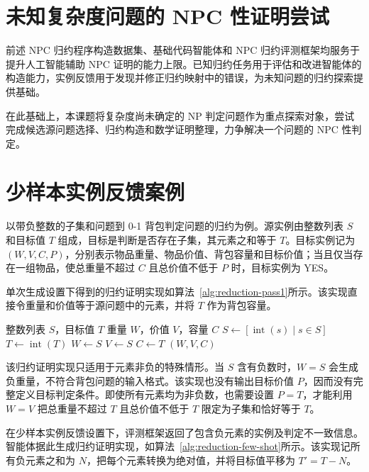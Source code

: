 \section{未知复杂度问题的 NPC 性证明尝试}

前述 NPC 归约程序构造数据集、基础代码智能体和 NPC 归约评测框架均服务于提升人工智能辅助 NPC 证明的能力上限。已知归约任务用于评估和改进智能体的构造能力，实例反馈用于发现并修正归约映射中的错误，为未知问题的归约探索提供基础。

在此基础上，本课题将复杂度尚未确定的 NP 判定问题作为重点探索对象，尝试完成候选源问题选择、归约构造和数学证明整理，力争解决一个问题的 NPC 性判定。

\section{少样本实例反馈案例}

以带负整数的子集和问题到 0-1 背包判定问题的归约为例。源实例由整数列表 \(S\) 和目标值 \(T\) 组成，目标是判断是否存在子集，其元素之和等于 \(T\)。目标实例记为 \((W,V,C,P)\)，分别表示物品重量、物品价值、背包容量和目标价值；当且仅当存在一组物品，使总重量不超过 \(C\) 且总价值不低于 \(P\) 时，目标实例为 YES。

单次生成设置下得到的归约证明实现如算法~\ref{alg:reduction-pass1}所示。该实现直接令重量和价值等于源问题中的元素，并将 \(T\) 作为背包容量。

\begin{algorithm}[!htbp]
    \small
    \caption{单次生成设置下的归约证明实现}
    \label{alg:reduction-pass1}
    \begin{algorithmic}[1]
        \Require 整数列表 \(S\)，目标值 \(T\)
        \Ensure 重量 \(W\)，价值 \(V\)，容量 \(C\)
        \State \(S \gets [\operatorname{int}(s)\mid s\in S]\)
        \State \(T \gets \operatorname{int}(T)\)
        \State \(W \gets S\)
        \State \(V \gets S\)
        \State \(C \gets T\)
        \State \Return \((W,V,C)\)
    \end{algorithmic}
\end{algorithm}

该归约证明实现只适用于元素非负的特殊情形。当 \(S\) 含有负数时，\(W=S\) 会生成负重量，不符合背包问题的输入格式。该实现也没有输出目标价值 \(P\)，因而没有完整定义目标判定条件。即使所有元素均为非负数，也需要设置 \(P=T\)，才能利用 \(W=V\) 把总重量不超过 \(T\) 且总价值不低于 \(T\) 限定为子集和恰好等于 \(T\)。

在少样本实例反馈设置下，评测框架返回了包含负元素的实例及判定不一致信息。智能体据此生成归约证明实现，如算法~\ref{alg:reduction-few-shot}所示。该实现记所有负元素之和为 \(N\)，把每个元素转换为绝对值，并将目标值平移为 \(T'=T-N\)。

